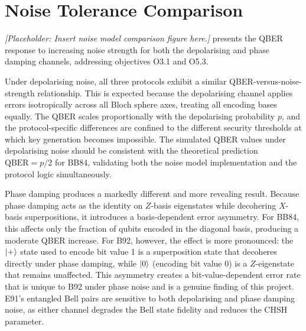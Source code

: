 \documentclass[10pt, a4paper]{report}
\begin{document}



\section{Noise Tolerance Comparison}


\textit{[Placeholder: Insert noise model comparison figure here.]}  presents the QBER response to increasing noise strength for both the depolarising and phase damping channels, addressing objectives O3.1 and O5.3.

Under depolarising noise, all three protocols exhibit a similar QBER-versus-noise-strength relationship. This is expected because the depolarising channel applies errors isotropically across all Bloch sphere axes, treating all encoding bases equally. The QBER scales proportionally with the depolarising probability $p$, and the protocol-specific differences are confined to the different security thresholds at which key generation becomes impossible. The simulated QBER values under depolarising noise should be consistent with the theoretical prediction $\text{QBER} = p/2$ for BB84, validating both the noise model implementation and the protocol logic simultaneously.

Phase damping produces a markedly different and more revealing result. Because phase damping acts as the identity on $Z$-basis eigenstates while decohering $X$-basis superpositions, it introduces a basis-dependent error asymmetry. For BB84, this affects only the fraction of qubits encoded in the diagonal basis, producing a moderate QBER increase. For B92, however, the effect is more pronounced: the $\ket{+}$ state used to encode bit value 1 is a superposition state that decoheres directly under phase damping, while $\ket{0}$ (encoding bit value 0) is a $Z$-eigenstate that remains unaffected. This asymmetry creates a bit-value-dependent error rate that is unique to B92 under phase noise and is a genuine finding of this project. E91's entangled Bell pairs are sensitive to both depolarising and phase damping noise, as either channel degrades the Bell state fidelity and reduces the CHSH parameter.
\end{document}

